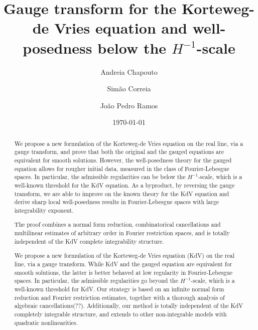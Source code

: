 \documentclass[%
11pt,  reqno]{amsart}
\title[Gauge transform for KdV]{Gauge transform for the Korteweg-de Vries equation and well-posedness below the $H^{-1}$-scale}
\author[A.~Chapouto \and S.~Correia \and J.~P.~Ramos]
{Andreia Chapouto \and Sim\~ao Correia \and Jo\~ao Pedro Ramos}
\date{\today}
\newcommand{\5}{\textup{V}}
\theoremstyle{remark}
\numberwithin{equation}{section}
\numberwithin{theorem}{section}
\begin{document}
\begin{abstract}
We propose a new formulation of the Korteweg-de Vries equation on the real line, via a gauge transform, and prove that both the original and the gauged equations are equivalent for smooth solutions. However, the well-posedness theory for the gauged equation allows for rougher initial data, measured in the class of Fourier-Lebesgue spaces. In particular, the admissible regularities can be below the $H^{-1}$-scale, which is a well-known threshold for the KdV equation. As a byproduct, by reversing the gauge transform, we are able to improve on the known theory for the KdV equation and derive sharp local well-posedness results in Fourier-Lebesgue spaces with large integrability exponent.

The proof combines a normal form reduction, combinatorical cancellations and multilinear estimates of arbitrary order in Fourier restriction spaces, and is totally independent of the KdV complete integrability structure.

{
\color{blue}

We propose a new formulation of the Korteweg-de Vries equation (KdV) on the real line, via a gauge transform.
While KdV and the gauged equation are equivalent for smooth solutions, the latter is better behaved at low regularity in Fourier-Lebesgue spaces. In particular, the admissible regularities go beyond the $H^{-1}$-scale, which is a well-known threshold for KdV. 
% 
Our strategy is based on an infinite normal form reduction and Fourier restriction estimates, together with a thorough analysis of algebraic cancellations(??). Additionally, our method is totally independent of the KdV completely integrable structure, and extends to other non-integrable models with quadratic nonlinearities. 
}

\end{abstract}
    
	\maketitle
	
	
	
	
	




\end{document}
